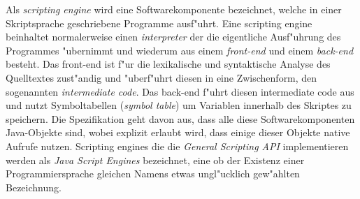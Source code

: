 Als \emph{scripting engine} wird eine Softwarekomponente bezeichnet, welche in einer Skriptsprache geschriebene Programme ausf"uhrt.
Eine scripting engine beinhaltet normalerweise einen \emph{interpreter} der die eigentliche Ausf"uhrung des Programmes "ubernimmt und
wiederum aus einem \emph{front-end} und einem \emph{back-end} besteht. Das front-end ist f"ur die lexikalische und syntaktische
Analyse des Quelltextes zust"andig und "uberf"uhrt diesen in eine Zwischenform, den sogenannten \emph{intermediate code}.
Das back-end f"uhrt diesen intermediate code aus und nutzt Symboltabellen (\emph{symbol table}) um Variablen innerhalb des Skriptes
zu speichern. Die Spezifikation geht davon aus, dass alle diese Softwarekomponenten Java-Objekte sind, wobei explizit erlaubt wird,
dass einige dieser Objekte native Aufrufe nutzen. Scripting engines die die \emph{General Scripting API} implementieren werden als 
\emph{Java Script Engines} bezeichnet, eine ob der Existenz einer Programmiersprache gleichen Namens etwas ungl"ucklich gew"ahlten 
Bezeichnung.

